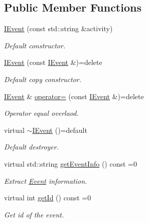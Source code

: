 \subsection*{Public Member Functions}
\begin{DoxyCompactItemize}
\item 
\hyperlink{class_spider_1_1_event_1_1_i_event_aaebd414668b8f358b5cc1bc655038256}{I\+Event} (const std\+::string \&activity)
\begin{DoxyCompactList}\small\item\em Default constructor. \end{DoxyCompactList}\item 
\mbox{\label{class_spider_1_1_event_1_1_i_event_a2e19a700707a4f951575dabf2af20cb1}} 
\hyperlink{class_spider_1_1_event_1_1_i_event_a2e19a700707a4f951575dabf2af20cb1}{I\+Event} (const \hyperlink{class_spider_1_1_event_1_1_i_event}{I\+Event} \&)=delete
\begin{DoxyCompactList}\small\item\em Default copy constructor. \end{DoxyCompactList}\item 
\hyperlink{class_spider_1_1_event_1_1_i_event}{I\+Event} \& \hyperlink{class_spider_1_1_event_1_1_i_event_a644158f21b7bf172d099819e23d1033e}{operator=} (const \hyperlink{class_spider_1_1_event_1_1_i_event}{I\+Event} \&)=delete
\begin{DoxyCompactList}\small\item\em Operator equal overlaod. \end{DoxyCompactList}\item 
\mbox{\label{class_spider_1_1_event_1_1_i_event_a7494be717cfb8f0842b15446a14a655b}} 
virtual \hyperlink{class_spider_1_1_event_1_1_i_event_a7494be717cfb8f0842b15446a14a655b}{$\sim$\+I\+Event} ()=default
\begin{DoxyCompactList}\small\item\em Default destroyer. \end{DoxyCompactList}\item 
virtual std\+::string \hyperlink{class_spider_1_1_event_1_1_i_event_ac8471df73080237faea55de539d968a0}{get\+Event\+Info} () const =0
\begin{DoxyCompactList}\small\item\em Extract \hyperlink{namespace_spider_1_1_event}{Event} information. \end{DoxyCompactList}\item 
virtual int \hyperlink{class_spider_1_1_event_1_1_i_event_a902d1376faa8e5948fa5bfe8d7208c88}{get\+Id} () const =0
\begin{DoxyCompactList}\small\item\em Get id of the event. \end{DoxyCompactList}\end{DoxyCompactItemize}
